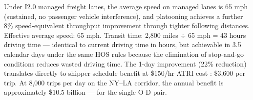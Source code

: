 Under I2.0 managed freight lanes, the average speed on managed lanes is 65 mph (sustained, no passenger vehicle interference), and platooning achieves a further 8\% speed-equivalent throughput improvement through tighter following distances. Effective average speed: 65 mph. Transit time: 2,800 miles $\div$ 65 mph = 43 hours driving time --- identical to current driving time in hours, but achievable in 3.5 calendar days under the same HOS rules because the elimination of stop-and-go conditions reduces wasted driving time. The 1-day improvement (22\% reduction) translates directly to shipper schedule benefit at \$150/hr ATRI cost \citep{ATRI_costs2024}: \$3,600 per trip. At 8,000 trips per day on the NY--LA corridor, the annual benefit is approximately \$10.5 billion --- for the single O-D pair.
